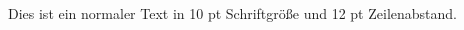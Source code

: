 \documentclass[10pt,a4paper,oneside,abstracton]{scrartcl}
\begin{document}
\begin{multicols}{2}
		
		
		
		
		Dies ist ein normaler Text in 10 pt Schriftgröße und 12 pt Zeilenabstand.
		
		
		\begin{thebibliography}{9}
			
			

\end{thebibliography}
\end{multicols}
\end{document}
